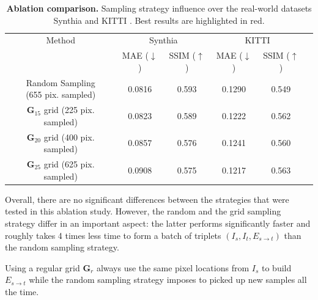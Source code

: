 \begin{table}[h!]
    \caption{\textbf{Ablation comparison.} Sampling strategy influence over the real-world datasets Synthia \citep{ros2016synthia} and KITTI \citep{geiger2012we}. Best results are highlighted in \colorbox{red!25}{red}. }
    \label{tab:3}
    \begin{center}%
    \begin{adjustbox}{width =\linewidth}
    \begin{tabular}[h]{c||ccccc}
    \hline
      Method & \multicolumn{2}{c}{Synthia} & \multicolumn{2}{c}{KITTI} \\
      &  MAE ($\downarrow$) & SSIM ($\uparrow$) & MAE ($\downarrow$) & SSIM ($\uparrow$) \\
    \hline
    \makecell{ Random Sampling \\ \footnotesize{(655 pix. sampled)}}& \cellcolor{red!25}0.0816 & \cellcolor{red!25}0.593 & 0.1290 & 0.549   \\ \hline
\makecell{$\textbf{G}_{15}$ grid \\ \footnotesize{(225 pix. sampled)}} & 0.0823 & 0.589 & 0.1222 & 0.562   \\ \hline
\makecell{$\textbf{G}_{20}$ grid \\ \footnotesize{(400 pix. sampled)}} & 0.0857 & 0.576 & 0.1241 & 0.560  \\ \hline
\makecell{$\textbf{G}_{25}$ grid \\ \footnotesize{(625 pix. sampled)}} & 0.0908 & 0.575 & \cellcolor{red!25}0.1217 & \cellcolor{red!25}0.563   \\ 
    \hline 
    \end{tabular}
    \end{adjustbox}
    \end{center}
    \end{table}


Overall, there are no significant differences between the strategies that were tested in this ablation study.  However, the random and the grid sampling strategy differ in an important aspect: the latter performs significantly faster and roughly takes 4 times less time to form a batch of triplets $\left(I_{s},I_{t},E_{s\xrightarrow{}t}\right)$ than the random sampling strategy. \newline

Using a regular grid $\textbf{G}_{r}$ always use the same pixel locations from $I_s$ to build  $E_{s\xrightarrow{}t}$ while the random sampling strategy imposes to picked up new samples all the time.  

